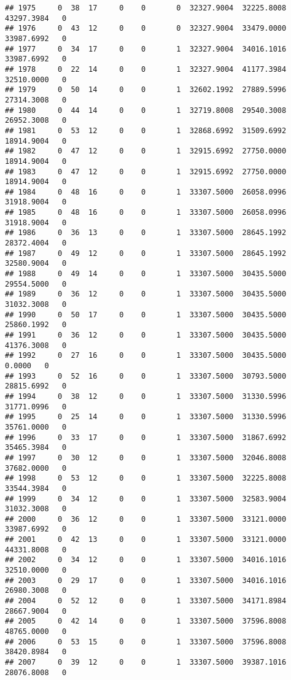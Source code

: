\documentclass[
]{article}
\begin{document}
\begin{enumerate}
\begin{verbatim}
## 1975     0  38  17     0    0       0  32327.9004  32225.8008  43297.3984   0
## 1976     0  43  12     0    0       0  32327.9004  33479.0000  33987.6992   0
## 1977     0  34  17     0    0       1  32327.9004  34016.1016  33987.6992   0
## 1978     0  22  14     0    0       1  32327.9004  41177.3984  32510.0000   0
## 1979     0  50  14     0    0       1  32602.1992  27889.5996  27314.3008   0
## 1980     0  44  14     0    0       1  32719.8008  29540.3008  26952.3008   0
## 1981     0  53  12     0    0       1  32868.6992  31509.6992  18914.9004   0
## 1982     0  47  12     0    0       1  32915.6992  27750.0000  18914.9004   0
## 1983     0  47  12     0    0       1  32915.6992  27750.0000  18914.9004   0
## 1984     0  48  16     0    0       1  33307.5000  26058.0996  31918.9004   0
## 1985     0  48  16     0    0       1  33307.5000  26058.0996  31918.9004   0
## 1986     0  36  13     0    0       1  33307.5000  28645.1992  28372.4004   0
## 1987     0  49  12     0    0       1  33307.5000  28645.1992  32580.9004   0
## 1988     0  49  14     0    0       1  33307.5000  30435.5000  29554.5000   0
## 1989     0  36  12     0    0       1  33307.5000  30435.5000  31032.3008   0
## 1990     0  50  17     0    0       1  33307.5000  30435.5000  25860.1992   0
## 1991     0  36  12     0    0       1  33307.5000  30435.5000  41376.3008   0
## 1992     0  27  16     0    0       1  33307.5000  30435.5000      0.0000   0
## 1993     0  52  16     0    0       1  33307.5000  30793.5000  28815.6992   0
## 1994     0  38  12     0    0       1  33307.5000  31330.5996  31771.0996   0
## 1995     0  25  14     0    0       1  33307.5000  31330.5996  35761.0000   0
## 1996     0  33  17     0    0       1  33307.5000  31867.6992  35465.3984   0
## 1997     0  30  12     0    0       1  33307.5000  32046.8008  37682.0000   0
## 1998     0  53  12     0    0       1  33307.5000  32225.8008  33544.3984   0
## 1999     0  34  12     0    0       1  33307.5000  32583.9004  31032.3008   0
## 2000     0  36  12     0    0       1  33307.5000  33121.0000  33987.6992   0
## 2001     0  42  13     0    0       1  33307.5000  33121.0000  44331.8008   0
## 2002     0  34  12     0    0       1  33307.5000  34016.1016  32510.0000   0
## 2003     0  29  17     0    0       1  33307.5000  34016.1016  26980.3008   0
## 2004     0  52  12     0    0       1  33307.5000  34171.8984  28667.9004   0
## 2005     0  42  14     0    0       1  33307.5000  37596.8008  48765.0000   0
## 2006     0  53  15     0    0       1  33307.5000  37596.8008  38420.8984   0
## 2007     0  39  12     0    0       1  33307.5000  39387.1016  28076.8008   0

\end{verbatim}
\end{enumerate}
\end{document}
